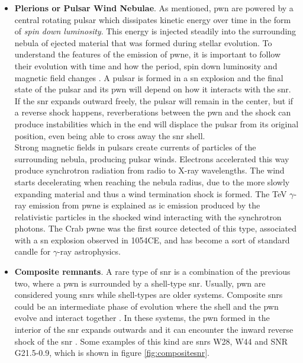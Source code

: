 \documentclass[main.tex]{subfiles}
\begin{document}
\begin{itemize}
    \item \textbf{Plerions or Pulsar Wind Nebulae}. As mentioned, \gls{pwn} are powered by a central rotating pulsar which dissipates kinetic energy over time in the form of \textit{spin down luminosity}. This energy is injected steadily into the surrounding nebula of ejected material that was formed during stellar evolution. To understand the features of the emission of \gls{pwne}, it is important to follow their evolution with time and how the period, spin down luminosity and magnetic field changes \cite{2006PWNe}. A pulsar is formed in a \gls{sn} explosion and the final state of the pulsar and its \gls{pwn} will depend on how it interacts with the \gls{snr}. If the \gls{snr} expands outward freely, the pulsar will remain in the center, but if a reverse shock happens, reverberations between the \gls{pwn} and the shock can produce instabilities which in the end will displace the pulsar from its original position, even being able to cross away the \gls{snr} shell.\\
    Strong magnetic fields in pulsars create currents of particles of the surrounding nebula, producing pulsar winds. Electrons accelerated this way produce synchrotron radiation from radio to X-ray wavelengths. The wind starts decelerating when reaching the nebula radius, due to the more slowly expanding material and thus a wind termination shock is formed. The TeV $\gamma$-ray emission from \gls{pwne} is explained as \gls{ic} emission produced by the relativistic particles in the shocked wind interacting with the synchrotron photons.
    The Crab \gls{pwne} was the first source detected of this type, associated with a \gls{sn} explosion observed in 1054CE, and has become a sort of standard candle for $\gamma$-ray astrophysics.\\
    
    \item \textbf{Composite remnants}. A rare type of \gls{snr} is a combination of the previous two, where a \gls{pwn} is surrounded by a shell-type \gls{snr}. Usually, \gls{pwn} are considered young \glspl{snr} while shell-types are older systems. Composite \glspl{snr} could be an intermediate phase of evolution where the shell and the \gls{pwn} evolve and interact together \cite{2014compositeSNRhess}. In these systems, the \gls{pwn} formed in the interior of the \gls{snr} expands outwards and it can encounter the inward reverse shock of the \gls{snr} \cite{2015SNRingammarays}. Some examples of this kind are \glspl{snr} W28, W44 and SNR G21.5-0.9, which is shown in figure \ref{fig:compositesnr}. \\
\end{itemize} 
\end{document}
